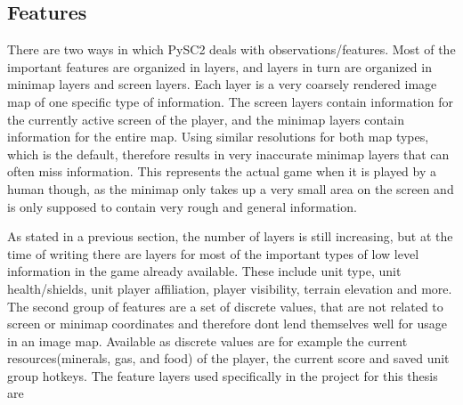 \subsection{Features}
\label{sec:pysc2_features}
There are two ways in which PySC2 deals with observations/features. Most of the important features are organized in layers,
and layers in turn are organized in minimap layers and screen layers. Each layer is a very coarsely rendered image map of one specific type of information. The screen layers contain information for the currently active screen of the player, and the minimap layers contain information for the entire map. Using similar resolutions for both map types, which is the default, therefore results in very inaccurate minimap layers that can often miss information. This represents the actual game when it is played by a human though, as the minimap only takes up a very small area on the screen and is only supposed to contain very rough and general information.

As stated in a previous section, the number of layers is still increasing, but at the time of writing there are layers for most of the important types of low level information in the game already available. These include unit type, unit health/shields, unit player affiliation, player visibility, terrain elevation and more.
The second group of features are a set of discrete values, that are not related to screen or minimap coordinates and therefore dont lend themselves well for usage in an image map. Available as discrete values are for example the current resources(minerals, gas, and food) of the player, the current score and saved unit group hotkeys.
The feature layers used specifically in the project for this thesis are

